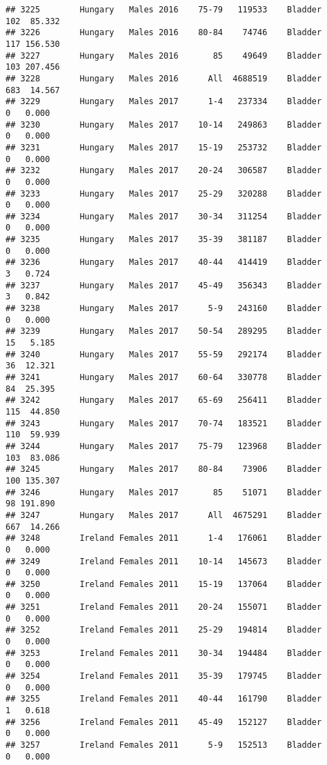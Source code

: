 \documentclass[
]{article}
\begin{document}
\begin{verbatim}
## 3225        Hungary   Males 2016    75-79   119533    Bladder    102  85.332
## 3226        Hungary   Males 2016    80-84    74746    Bladder    117 156.530
## 3227        Hungary   Males 2016       85    49649    Bladder    103 207.456
## 3228        Hungary   Males 2016      All  4688519    Bladder    683  14.567
## 3229        Hungary   Males 2017      1-4   237334    Bladder      0   0.000
## 3230        Hungary   Males 2017    10-14   249863    Bladder      0   0.000
## 3231        Hungary   Males 2017    15-19   253732    Bladder      0   0.000
## 3232        Hungary   Males 2017    20-24   306587    Bladder      0   0.000
## 3233        Hungary   Males 2017    25-29   320288    Bladder      0   0.000
## 3234        Hungary   Males 2017    30-34   311254    Bladder      0   0.000
## 3235        Hungary   Males 2017    35-39   381187    Bladder      0   0.000
## 3236        Hungary   Males 2017    40-44   414419    Bladder      3   0.724
## 3237        Hungary   Males 2017    45-49   356343    Bladder      3   0.842
## 3238        Hungary   Males 2017      5-9   243160    Bladder      0   0.000
## 3239        Hungary   Males 2017    50-54   289295    Bladder     15   5.185
## 3240        Hungary   Males 2017    55-59   292174    Bladder     36  12.321
## 3241        Hungary   Males 2017    60-64   330778    Bladder     84  25.395
## 3242        Hungary   Males 2017    65-69   256411    Bladder    115  44.850
## 3243        Hungary   Males 2017    70-74   183521    Bladder    110  59.939
## 3244        Hungary   Males 2017    75-79   123968    Bladder    103  83.086
## 3245        Hungary   Males 2017    80-84    73906    Bladder    100 135.307
## 3246        Hungary   Males 2017       85    51071    Bladder     98 191.890
## 3247        Hungary   Males 2017      All  4675291    Bladder    667  14.266
## 3248        Ireland Females 2011      1-4   176061    Bladder      0   0.000
## 3249        Ireland Females 2011    10-14   145673    Bladder      0   0.000
## 3250        Ireland Females 2011    15-19   137064    Bladder      0   0.000
## 3251        Ireland Females 2011    20-24   155071    Bladder      0   0.000
## 3252        Ireland Females 2011    25-29   194814    Bladder      0   0.000
## 3253        Ireland Females 2011    30-34   194484    Bladder      0   0.000
## 3254        Ireland Females 2011    35-39   179745    Bladder      0   0.000
## 3255        Ireland Females 2011    40-44   161790    Bladder      1   0.618
## 3256        Ireland Females 2011    45-49   152127    Bladder      0   0.000
## 3257        Ireland Females 2011      5-9   152513    Bladder      0   0.000

\end{verbatim}
\end{document}
